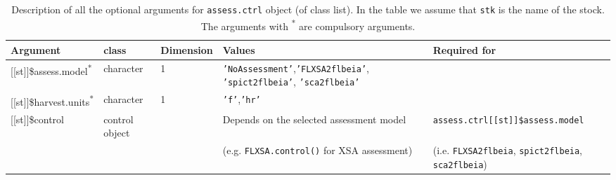 \begin{landscape}
\begin{table}[!ht]
\end{table}
	

\begin{table}[!ht]

  \centering
  \begin{footnotesize}

    \caption{Description of all the optional arguments for \texttt{assess.ctrl} object (of class list).
    In the table we assume that \texttt{stk} is the name of the stock.
    The arguments with \textsuperscript{*} are compulsory arguments.}
    
    \label{tb:A3.table6}


    \begin{threeparttable}

      \begin{tabular}{lllll} %
        \hline
        Argument & class & Dimension & Values & Required for \\
        \hline
        {[[st]]}\$assess.model\textsuperscript{*} & character & 1 & \texttt{'NoAssessment'},\texttt{'FLXSA2flbeia'}, 
            \texttt{'spict2flbeia'}, \texttt{'sca2flbeia'} &  \\
        {[[st]]}\$harvest.units\textsuperscript{*} & character & 1 & \texttt{'f'},\texttt{'hr'} &  \\
        {[[st]]}\$control & control object &  & Depends on the selected assessment model & \texttt{assess.ctrl[[st]]\$assess.model} \\
         &  &  & (e.g. \texttt{FLXSA.control()} for XSA assessment) & (i.e. \texttt{FLXSA2flbeia}, \texttt{spict2flbeia}, \texttt{sca2flbeia}) \\
        \hline
      \end{tabular}

     \end{threeparttable}
  \end{footnotesize}


\end{table}
\end{landscape}
